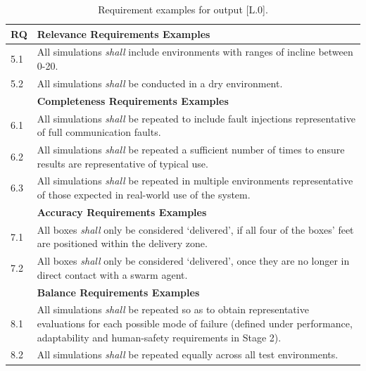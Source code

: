 \documentclass[runningheads]{llncs}
\begin{document}
\begin{table}[!h]%
	\centering
	\begin{tabular}{p{0.6cm} p{11.6cm}}
		\textbf{RQ} & \textbf{Relevance Requirements Examples} \\
		\hline
		5.1 & All simulations \emph{shall} include environments with ranges of incline between 0-20\textdegree.\\
		\hline
		5.2 & All simulations \emph{shall} be conducted in a dry environment.\\
		\hline
		& \textbf{Completeness Requirements Examples} \\
		\hline
		6.1 & All simulations \emph{shall} be repeated to include fault injections representative of full communication faults.\\
		\hline
		6.2 & All simulations \emph{shall} be repeated a sufficient number of times to ensure results are representative of typical use.\\
		\hline
		6.3 & All simulations \emph{shall} be repeated in multiple environments representative of those expected in real-world use of the system.\\
		\hline
		& \textbf{Accuracy Requirements Examples} \\
		\hline
		7.1 & All boxes \emph{shall} only be considered `delivered’, if all four of the boxes’ feet are positioned within the delivery zone.\\
		\hline
		7.2 & All boxes \emph{shall} only be considered `delivered’, once they are no longer in direct contact with a swarm agent.\\
		\hline
		& \textbf{Balance Requirements Examples} \\
		\hline
		8.1 & All simulations \emph{shall} be repeated so as to obtain representative evaluations for each possible mode of failure (defined under performance, adaptability and human-safety requirements in Stage 2).\\
		\hline
		8.2 & All simulations \emph{shall} be repeated equally across all test environments.\\
		\hline
	\end{tabular}
	\caption{Requirement examples for output [L.0].}
	\label{tab:L0_req}
	\vspace{-4ex}
\end{table}
\end{document}
